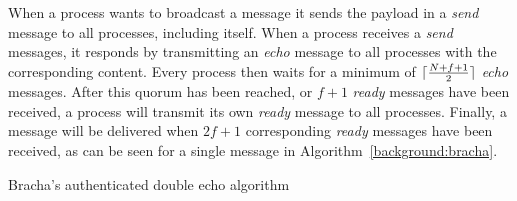 When a process wants to broadcast a message it sends the payload in a \textit{send} message to all processes, including itself. When a process receives a \textit{send} messages, it responds by transmitting an \textit{echo} message to all processes with the corresponding content. Every process then waits for a minimum of $\lceil\frac{N+f+1}{2}\rceil$ \textit{echo} messages. 
After this quorum has been reached, or $f+1$ \textit{ready} messages have been received, a process will transmit its own \textit{ready} message to all processes. Finally, a message will be delivered when $2f+1$ corresponding \textit{ready} messages have been received, as can be seen for a single message in Algorithm~\ref{background:bracha}.

\begin{algorithm}[h]
  \DontPrintSemicolon
  
  
  
 \caption{Bracha's authenticated double echo algorithm}
 \label{background:bracha}
\end{algorithm}

